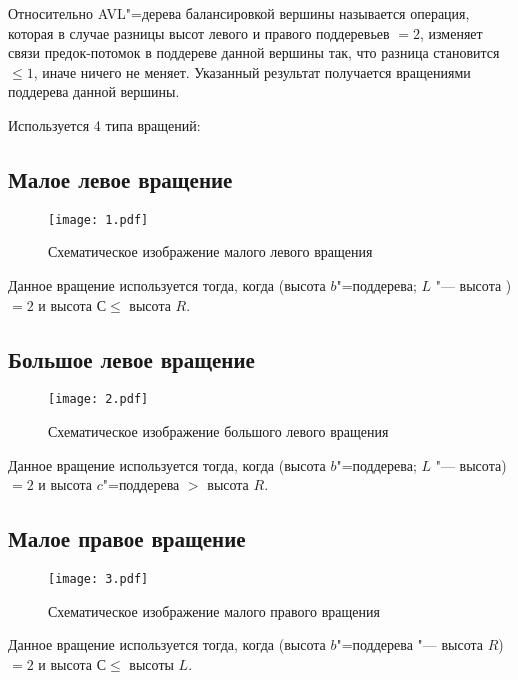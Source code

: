 Относительно AVL"=дерева балансировкой вершины называется операция,
которая в случае разницы высот левого и правого поддеревьев $= 2$,
изменяет связи предок-потомок в поддереве данной вершины так,
что разница становится $ \leqslant 1$, иначе ничего не меняет.
Указанный результат получается вращениями поддерева данной вершины.

Используется 4 типа вращений:

\subsection*{Малое левое вращение}

\begin{figure}[ht]
    \texttt{[image: 1.pdf]}
    
    \caption{Схематическое изображение малого левого вращения}    
\end{figure}

Данное вращение используется тогда,
когда (высота $b$"=поддерева; $L$ "--- высота )
$= 2$ и высота $С \leqslant$ высота $R$.

\subsection*{Большое левое вращение}

\begin{figure}[ht]
\texttt{[image: 2.pdf]}

\caption{Схематическое изображение большого левого вращения}
\end{figure}

Данное вращение используется тогда,
когда (высота $b$"=поддерева; $L$ "--- высота)
$= 2$ и высота $c$"=поддерева $>$ высота $R$.

\subsection*{Малое правое вращение}

\begin{figure}[ht]
    \texttt{[image: 3.pdf]}
    
    \caption{Схематическое изображение малого правого вращения}
\end{figure}

Данное вращение используется тогда,
когда (высота $b$"=поддерева "--- высота $R$)
$= 2$ и высота $С \leqslant $ высоты $L$.

